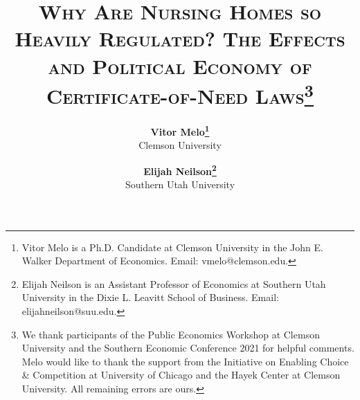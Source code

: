 \documentclass[12pt]{article}
\begin{document}

\title{\textsc{Why Are Nursing Homes so Heavily Regulated? The Effects and Political Economy of Certificate-of-Need Laws}\thanks{We thank participants of the Public Economics Workshop at Clemson University and the Southern Economic Conference 2021 for helpful comments. Melo would like to thank the support from the Initiative on Enabling Choice & Competition at University of Chicago and the Hayek Center at Clemson University. All remaining errors are ours.}\\
	$~$\\}

\medskip

\author{\textbf{Vitor Melo\protect\thanks{Vitor Melo is a Ph.D. Candidate at Clemson University in the John E. Walker Department of Economics. Email: vmelo@clemson.edu.}} \\ Clemson University
\and
\textbf{Elijah Neilson\protect\thanks{Elijah Neilson is an Assistant Professor of Economics at Southern Utah University in the Dixie L. Leavitt School of Business. Email: elijahneilson@suu.edu.}} \\ Southern Utah University
  	}		

\date{}              %





\renewcommand{\thefootnote}{\fnsymbol{footnote}}

\singlespacing

\maketitle
\end{document}
